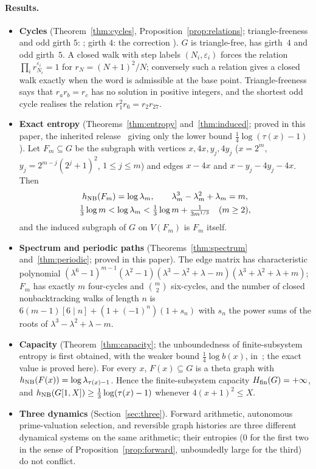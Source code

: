 \paragraph{Results.}
\begin{itemize}[leftmargin=1.6em,itemsep=2pt]
\item \textbf{Cycles} (Theorem~\ref{thm:cycles}, Proposition~\ref{prop:relations}; triangle-freeness and odd girth $5$: \cite{UTHREE}; girth $4$: the correction \cite{UCOR}). $G$ is triangle-free, has girth~$4$ and odd girth~$5$. A closed walk with step labels $(N_i,\varepsilon_i)$ forces the relation $\prod_i r_{N_i}^{\varepsilon_i}=1$ for $r_N=(N+1)^2/N$; conversely such a relation gives a closed walk exactly when the word is admissible at the base point. Triangle-freeness says that $r_ar_b=r_c$ has no solution in positive integers, and the shortest odd cycle realises the relation $r_1^2r_6=r_2r_{27}$.
\item \textbf{Exact entropy} (Theorems~\ref{thm:entropy} and~\ref{thm:induced}; proved in this paper, the inherited release~\cite{UENT} giving only the lower bound $\tfrac14\log(\tau(x)-1)$). Let $F_m\subseteq G$ be the subgraph with vertices $x,4x,y_j,4y_j$ ($x=2^m$, $y_j=2^{m-j}(2^j+1)^2$, $1\le j\le m$) and edges $x\!-\!4x$ and $x\!-\!y_j\!-\!4y_j\!-\!4x$. Then
\[
\begin{gathered}
h_{\mathrm{NB}}(F_m)=\log\lambda_m,\qquad \lambda_m^3-\lambda_m^2+\lambda_m=m,\\
\tfrac13\log m<\log\lambda_m<\tfrac13\log m+\tfrac{1}{3m^{1/3}}\quad(m\ge2),
\end{gathered}
\]
and the induced subgraph of $G$ on $V(F_m)$ is $F_m$ itself.
\item \textbf{Spectrum and periodic paths} (Theorems~\ref{thm:spectrum} and~\ref{thm:periodic}; proved in this paper). The edge matrix has characteristic polynomial $(\lambda^6-1)^{m-1}(\lambda^2-1)(\lambda^3-\lambda^2+\lambda-m)(\lambda^3+\lambda^2+\lambda+m)$; $F_m$ has exactly $m$ four-cycles and $\binom m2$ six-cycles, and the number of closed nonbacktracking walks of length $n$ is $6(m-1)[6\mid n]+(1+(-1)^n)(1+s_n)$ with $s_n$ the power sums of the roots of $\lambda^3-\lambda^2+\lambda-m$.
\item \textbf{Capacity} (Theorem~\ref{thm:capacity}; the unboundedness of finite-subsystem entropy is first obtained, with the weaker bound $\tfrac14\log b(x)$, in~\cite{UENT}; the exact value is proved here). For every $x$, $F(x)\subseteq G$ is a theta graph with $h_{\mathrm{NB}}(F(x))=\log\lambda_{\tau(x)-1}$. Hence the finite-subsystem capacity $H_{\mathrm{fin}}(G)=+\infty$, and $h_{\mathrm{NB}}(G[1,X])\ge\tfrac13\log(\tau(x)-1)$ whenever $4(x+1)^2\le X$.
\item \textbf{Three dynamics} (Section~\ref{sec:three}). Forward arithmetic, autonomous prime-valuation selection, and reversible graph histories are three different dynamical systems on the same arithmetic; their entropies ($0$ for the first two in the sense of Proposition~\ref{prop:forward}, unboundedly large for the third) do not conflict.
\end{itemize}

